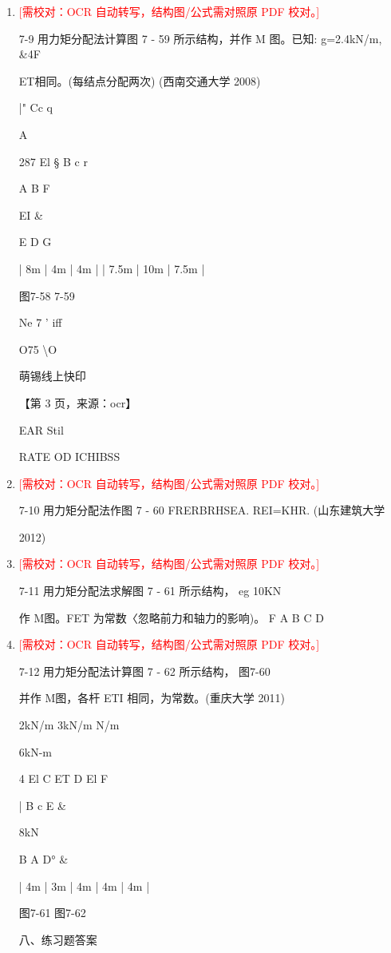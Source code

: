 \documentclass[UTF8,12pt,a4paper,openany]{ctexbook}
\newcommand{\TODO}[1]{\textcolor{red}{[需校对：#1]}}
\begin{document}
\begin{enumerate}[label=\textbf{\arabic*.},leftmargin=2em]
\item \TODO{OCR 自动转写，结构图/公式需对照原 PDF 校对。}\par 7-9 用力矩分配法计算图 7 - 59 所示结构，并作 M 图。已知: g=2.4kN/m, \&4F\par ET相同。(每结点分配两次) (西南交通大学 2008)\par |"  Cc                               q\par A\par 287            El         §                   B               c            r\par A           B                                                                  F\par EI              \&\par E              D         G\par |    8m     |  4m |  4m  |                 |   7.5m   |      10m      |   7.5m   |\par 图7-58 7-59\par Ne 7 ' iff\par O75 \textbackslash{}O\par 萌锡线上快印\par \par 【第 3 页，来源：ocr】\par EAR Stil\par RATE OD ICHIBSS
\item \TODO{OCR 自动转写，结构图/公式需对照原 PDF 校对。}\par 7-10 用力矩分配法作图 7 - 60 FRERBRHSEA. REI=KHR. (山东建筑大学\par 2012)
\item \TODO{OCR 自动转写，结构图/公式需对照原 PDF 校对。}\par 7-11 用力矩分配法求解图 7 - 61 所示结构，                 eg             10KN\par 作 M图。FET 为常数〈忽略前力和轴力的影响)。 F    A       B    C     D
\item \TODO{OCR 自动转写，结构图/公式需对照原 PDF 校对。}\par 7-12 用力矩分配法计算图 7 - 62 所示结构，            图7-60\par 并作 M图，各杆 ETI 相同，为常数。(重庆大学 2011)\par 2kN/m            3kN/m                            N/m\par 6kN-m\par 4    El    C ET    D El F\par |         B        c      E   \&\par 8kN\par B                      A        D°         \&\par |   4m    |  3m  |    4m            |   4m    |    4m    |\par 图7-61                                  图7-62\par 八、练习题答案

\end{enumerate}
\end{document}
